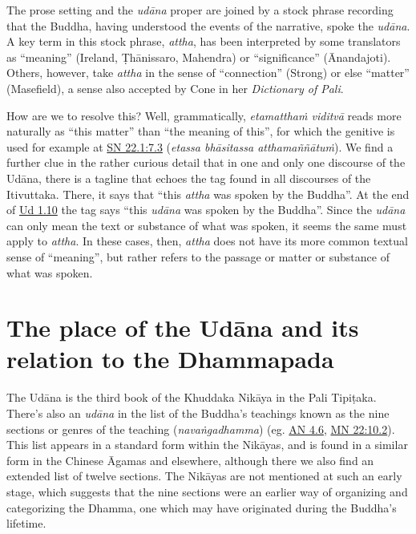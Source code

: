 \documentclass[12pt,openany]{book}%
\begin{document}
The prose setting and the \textit{\textsanskrit{udāna}} proper are joined by a stock phrase recording that the Buddha, having understood the events of the narrative, spoke the \textit{\textsanskrit{udāna}}. A key term in this stock phrase, \textit{attha}, has been interpreted by some translators as “meaning” (Ireland, \textsanskrit{Ṭhānissaro}, Mahendra) or “significance” (Ānandajoti). Others, however, take \textit{attha} in the sense of “connection” (Strong) or else “matter” (Masefield), a sense also accepted by Cone in her \textit{Dictionary of Pali}. 

How are we to resolve this? Well, grammatically, \textit{\textsanskrit{etamatthaṁ} \textsanskrit{viditvā}} reads more naturally as “this matter” than “the meaning of this”, for which the genitive is used for example at \href{https://suttacentral.net/sn22.1/en/sujato\#7.3}{SN 22.1:7.3} (\textit{etassa \textsanskrit{bhāsitassa} \textsanskrit{atthamaññātuṁ}}). We find a further clue in the rather curious detail that in one and only one discourse of the \textsanskrit{Udāna}, there is a tagline that echoes the tag found in all discourses of the Itivuttaka. There, it says that “this \textit{attha} was spoken by the Buddha”. At the end of \href{https://suttacentral.net/ud1.10/en/sujato}{Ud 1.10}  the tag says “this \textit{\textsanskrit{udāna}} was spoken by the Buddha”. Since the \textit{\textsanskrit{udāna}} can only mean the text or substance of what was spoken, it seems the same must apply to \textit{attha}. In these cases, then, \textit{attha} does not have its more common textual sense of “meaning”, but rather refers to the passage or matter or substance of what was spoken.

\section*{The place of the \textsanskrit{Udāna} and its relation to the Dhammapada}

The \textsanskrit{Udāna} is the third book of the Khuddaka \textsanskrit{Nikāya} in the Pali \textsanskrit{Tipiṭaka}. There’s also an \textit{\textsanskrit{udāna}} in the list of the Buddha’s teachings known as the nine sections or genres of the teaching (\textit{\textsanskrit{navaṅgadhamma}}) (eg. \href{https://suttacentral.net/an4.6/en/sujato}{AN 4.6}, \href{https://suttacentral.net/mn22/en/sujato\#10.2}{MN  22:10.2}). This list appears in a standard form within the \textsanskrit{Nikāyas}, and is found in a similar form in the Chinese Āgamas and elsewhere, although there we also find an extended list of twelve sections. The \textsanskrit{Nikāyas} are not mentioned at such an early stage, which suggests that the nine sections were an earlier way of organizing and categorizing the Dhamma, one which may have originated during the Buddha’s lifetime. 
\end{document}
